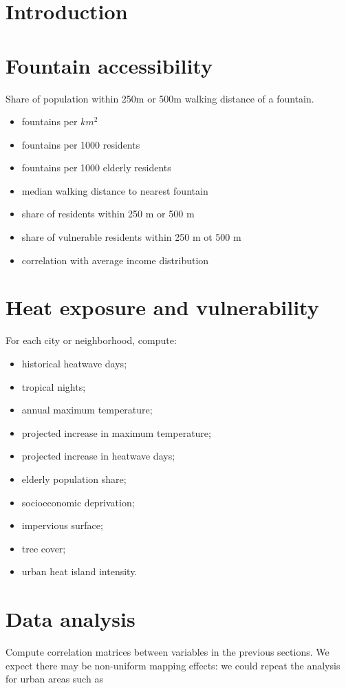 \documentclass[a4paper,11pt]{article}
\begin{document}
\section{Introduction}

\section{Fountain accessibility}
Share of population within 250m or 500m walking distance of a fountain.
\begin{itemize}
\item	fountains per $km^2$
\item	fountains per 1000 residents
\item	fountains per 1000 elderly residents
\item	median walking distance to nearest fountain
\item	share of residents within 250 m or 500 m
\item	share of vulnerable residents within 250 m ot 500 m
\item	correlation with average income distribution
\end{itemize}

\section{Heat exposure and vulnerability}
For each city or neighborhood, compute:
\begin{itemize}
\item	historical heatwave days;
\item	tropical nights;
\item	annual maximum temperature;
\item	projected increase in maximum temperature;
\item	projected increase in heatwave days;
\item	elderly population share;
\item	socioeconomic deprivation;
\item	impervious surface;
\item	tree cover;
\item	urban heat island intensity.
\end{itemize}
\section{Data analysis}
Compute correlation matrices between variables in the previous sections. We expect there may be non-uniform mapping effects: we could repeat the analysis for urban areas such as
\end{document}

